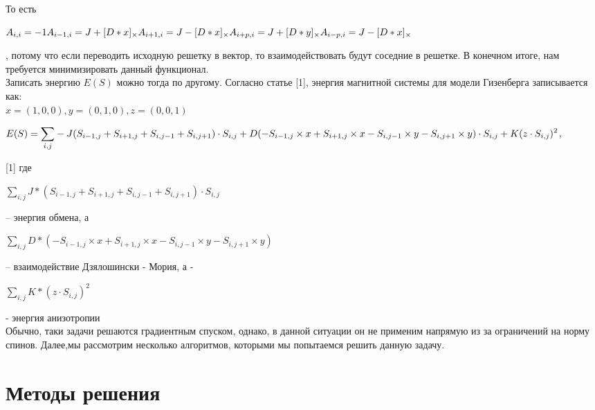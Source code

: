 \documentclass[ 12pt,x11names]{article}
\begin{document}
    То есть  \begin{center} $A_{i, i} = -1 \\ A_{i - 1, i} =  J + [D*x]_\times \\
    A_{i+1, i} =  J - [D*x]_\times \\
    A_{i + p, i} =  J + [D*y]_\times \\
    A_{i - p , i} =  J -  [D*x]_\times$
     \end{center}, потому что если переводить исходную решетку в вектор, то взаимодействовать будут соседние в решетке.
    В конечном итоге, нам требуется минимизировать данный функционал.\\
    Записать энергию $E(S)$ можно тогда по другому.
    Согласно статье [1], энергия магнитной системы для модели Гизенберга записывается как:\\
    $x = (1,0, 0), y = (0,1, 0), z =(0, 0 , 1)$\\
        \begin{center}
    $E(S) = \displaystyle{\sum_{i, j}} - J (S_{i - 1, j} + S_{i + 1, j} + S_{i, j - 1} + S_{i, j + 1}) \cdot S_{i,j} + \\
    D  (-S_{i - 1, j} \times x  + S_{i + 1, j} \times x - S_{i, j - 1} \times y - S_{i, j + 1} \times y)\cdot S_{i,j}
    + \\
    K  (z \cdot S_{i,j}) ^ 2$,\\
    \end{center}[1]
    где
     \begin{center}
    $\displaystyle{\sum_{i, j}} J* (S_{i - 1, j} + S_{i + 1, j} + S_{i, j - 1} + S_{i, j + 1}) \cdot S_{i,j}$\end{center} -- энергия обмена, а \begin{center}
    $\displaystyle{\sum_{i, j}} D * (-S_{i - 1, j} \times x  + S_{i + 1, j} \times x - S_{i, j - 1} \times y - S_{i, j + 1} \times y)$\end{center}  -- взаимодействие Дзялошински - Мория, а - \begin{center}
    $\displaystyle{\sum_{i, j}} K * (z \cdot S_{i,j}) ^ 2$\end{center} - энергия анизотропии\\
    Обычно, таки задачи решаются градиентным спуском, однако, в данной ситуации он не применим напрямую из за ограничений на норму спинов.
    Далее,мы рассмотрим несколько алгоритмов, которыми мы попытаемся решить данную задачу.
    \newpage
    \section{Методы решения}
\end{document}
